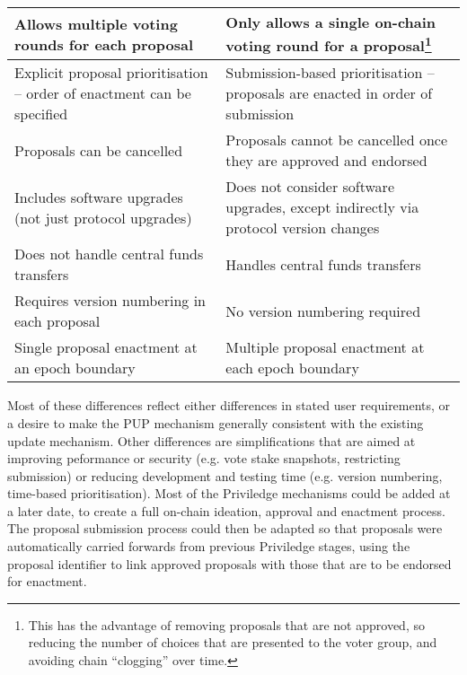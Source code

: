 \begin{tabular}{||p{3in}|p{3in}||}
  Allows multiple voting rounds for each proposal & Only allows a single on-chain voting round for a proposal\footnote{This has the advantage of removing proposals that are not approved, so reducing the number of choices that are presented to the voter group, and avoiding chain ``clogging'' over time.} \\\hline
  \hline
%
  Explicit proposal prioritisation -- order of enactment can be specified  & Submission-based prioritisation -- proposals are enacted in order of submission \\\hline
  Proposals can be cancelled & Proposals cannot be cancelled once they are approved and endorsed \\\hline
  Includes software upgrades (not just protocol upgrades) & Does not consider software upgrades, except indirectly via protocol version changes \\\hline
  Does not handle central funds transfers & Handles central funds transfers \\\hline
  Requires version numbering in each proposal & No version numbering required  \\\hline
  Single proposal enactment at an epoch boundary  & Multiple proposal enactment at each epoch boundary \\\hline
  \hline
\end{tabular}

Most of these differences reflect either differences in stated user requirements, or a desire to make
the PUP mechanism generally consistent with the existing update mechanism.
Other differences are simplifications that are aimed at improving peformance or security (e.g. vote
stake snapshots, restricting submission) or reducing development and testing time (e.g. version numbering, time-based prioritisation).
Most of the Priviledge mechanisms could be added at a later date, to create a full on-chain ideation, approval and enactment process.
The proposal submission process could then be adapted so that proposals were automatically carried forwards from previous Priviledge stages,
using the proposal identifier to link approved proposals with those that are to be endorsed for enactment.
